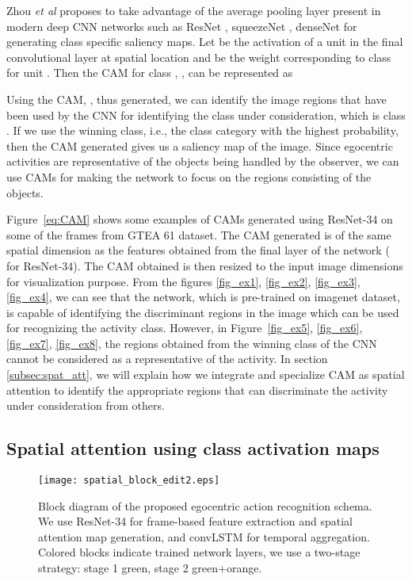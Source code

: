 \documentclass{bmvc2k}
\def\etal{\emph{et al}\bmvaOneDot}
\begin{document}
Zhou \etal \cite{zhou2016learning} proposes to take advantage of the average pooling layer present in modern deep CNN networks such as ResNet \cite{he2016deep}, squeezeNet \cite{iandola2016squeezenet}, denseNet \cite{huang2017densely} for generating class specific saliency maps. Let  be the activation of a unit  in the final convolutional layer at spatial location  and  be the weight corresponding to class  for unit . Then the CAM for class , , can be represented as
	
	Using the CAM, , thus generated, we can identify the image regions that have been used by the CNN for identifying the class under consideration, which is class . If we use the winning class, i.e., the class category with the highest probability, then the CAM generated gives us a saliency map of the image. Since egocentric activities are representative of the objects being handled by the observer, we can use CAMs for making the network to focus on the regions consisting of the objects.

Figure~\ref{eq:CAM} shows some examples of CAMs generated using ResNet-34 on some of the frames from GTEA 61 dataset. The CAM generated is of the same spatial dimension as the features obtained from the final layer of the network ( for ResNet-34). The CAM obtained is then resized to the input image dimensions for visualization purpose. From the figures \ref{fig_ex1}, \ref{fig_ex2}, \ref{fig_ex3}, \ref{fig_ex4}, we can see that the network, which is pre-trained on imagenet dataset, is capable of identifying the discriminant regions in the image which can be used for recognizing the activity class. However, in Figure~\ref{fig_ex5}, \ref{fig_ex6}, \ref{fig_ex7}, \ref{fig_ex8}, the regions obtained from the winning class of the CNN cannot be considered as a representative of the activity. In section \ref{subsec:spat_att}, we will explain how we integrate and specialize CAM as spatial attention to identify the appropriate regions that can discriminate the activity under consideration from others.

\subsection{Spatial attention using class activation maps}


	 \begin{figure}[t]
		\centering
		\texttt{[image: spatial\_block\_edit2.eps]}
		\vspace*{2mm}
		\caption{Block diagram of the proposed egocentric action recognition schema. We use ResNet-34 for frame-based feature extraction and spatial attention map generation, and convLSTM for temporal aggregation. Colored blocks indicate trained network layers, we use a two-stage strategy: stage 1 green, stage 2 green+orange.
		}
		\label{fig:block_dia}
	\end{figure}
\end{document}
